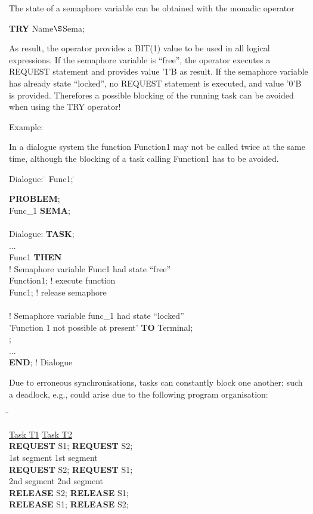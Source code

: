 The state of a semaphore variable can be obtained with the monadic
operator

{\bf TRY} Name$\S $Sema;

As result, the operator provides a BIT(1) value to be used in all
logical expressions. If the semaphore variable is ``free'', the operator
executes a REQUEST statement and provides value '1'B as result. If the
semaphore variable has already state ``locked'', no REQUEST statement
is executed, and value '0'B is provided. Therefores a possible blocking 
of the running task can be avoided when using the TRY operator!

Example:

In a dialogue system the function Function1 may not be called twice at the same time, although the
blocking of a task calling Function1 has to be avoided.

\begin{tabbing}
\x Dialogue: \= \x {} Func1; \x \= \kill

{\bf PROBLEM}; \> \> \\
 Func\_1 {\bf SEMA}; \> \> \\
   \> \> \\
   \x Dialogue: \> {\bf TASK}; \> \\
  \> \x ...      \> \\
  \>  Func1 {\bf THEN} \> \\
  \> \x \x ! Semaphore variable Func1 had state ``free'' \> \\
  \> \x {} Function1; \> ! execute function \\
  \> \x {} Func1;  \> ! release semaphore \\
  \>  \> \\
  \> \x \x ! Semaphore variable func\_1 had state ``locked'' \> \\
  \> \x {} 'Function 1 not possible at present' {\bf TO} Terminal; \> \\
  \> ; \> \\
  \> \x ... \> \\
  \> {\bf END}; ! Dialogue \>
\end{tabbing}

Due to erroneous synchronisations, tasks can constantly block one
another; such a deadlock, e.g., could arise due to the following program
organisation:

\begin{tabbing}
\hspace{6cm} \= \kill

\underline{Task T1}  \>       \underline{Task T2}  \\
{\bf REQUEST} S1;    \>       {\bf REQUEST} S2;    \\
\x 1st segment       \>       \x 1st segment       \\
{\bf REQUEST} S2;    \>       {\bf REQUEST} S1;    \\
\x 2nd segment       \>       \x 2nd segment       \\
{\bf RELEASE} S2;    \>       {\bf RELEASE} S1;    \\
{\bf RELEASE} S1;    \>       {\bf RELEASE} S2;
\end{tabbing}

